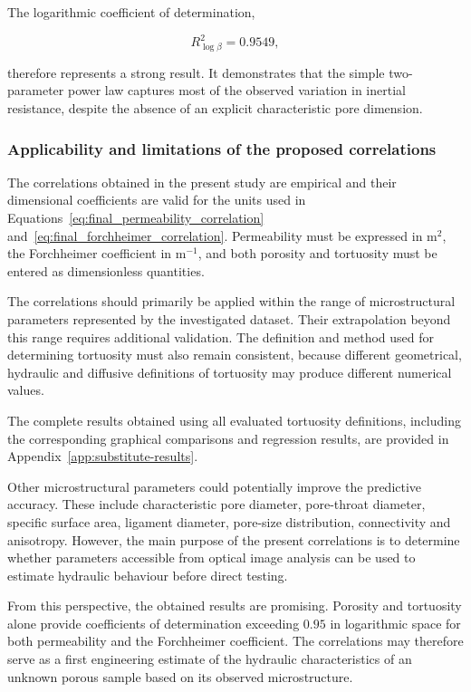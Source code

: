 \documentclass[a4paper]{article}
\begin{document}
The logarithmic coefficient of determination,

\begin{equation}
R^{2}_{\log\beta}
=
0.9549,
\end{equation}

therefore represents a strong result. It demonstrates that the simple
two-parameter power law captures most of the observed variation in inertial
resistance, despite the absence of an explicit characteristic pore dimension.

\subsubsection{Applicability and limitations of the proposed correlations}
\label{sec:correlation_applicability}

The correlations obtained in the present study are empirical and their
dimensional coefficients are valid for the units used in
Equations~\eqref{eq:final_permeability_correlation}
and~\eqref{eq:final_forchheimer_correlation}. Permeability must be expressed in
$\mathrm{m^{2}}$, the Forchheimer coefficient in $\mathrm{m^{-1}}$, and both
porosity and tortuosity must be entered as dimensionless quantities.

The correlations should primarily be applied within the range of
microstructural parameters represented by the investigated dataset. Their
extrapolation beyond this range requires additional validation. The definition
and method used for determining tortuosity must also remain consistent, because
different geometrical, hydraulic and diffusive definitions of tortuosity may
produce different numerical values.

The complete results obtained using all evaluated tortuosity definitions,
including the corresponding graphical comparisons and regression results, are
provided in Appendix~\ref{app:substitute-results}.

Other microstructural parameters could potentially improve the predictive
accuracy. These include characteristic pore diameter, pore-throat diameter,
specific surface area, ligament diameter, pore-size distribution, connectivity
and anisotropy. However, the main purpose of the present correlations is to
determine whether parameters accessible from optical image analysis can be
used to estimate hydraulic behaviour before direct testing.

From this perspective, the obtained results are promising. Porosity and
tortuosity alone provide coefficients of determination exceeding $0.95$ in
logarithmic space for both permeability and the Forchheimer coefficient. The
correlations may therefore serve as a first engineering estimate of the
hydraulic characteristics of an unknown porous sample based on its observed
microstructure.
\end{document}
